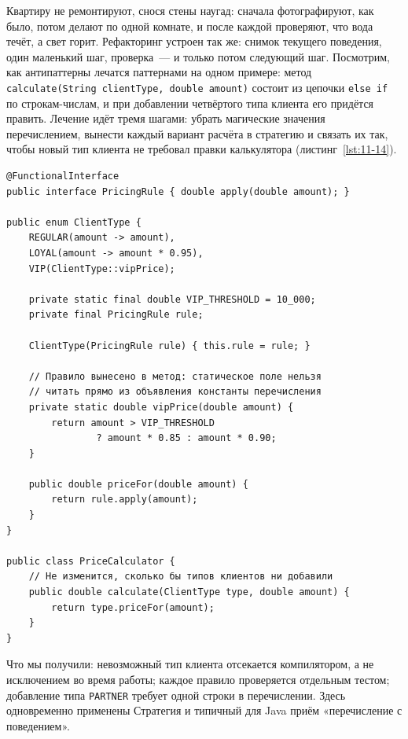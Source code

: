 Квартиру не ремонтируют, снося стены наугад: сначала фотографируют, как было,
потом делают по одной комнате, и после каждой проверяют, что вода течёт, а свет
горит. Рефакторинг устроен так же: снимок текущего поведения, один маленький
шаг, проверка~--- и только потом следующий шаг. Посмотрим, как антипаттерны
лечатся паттернами на одном примере: метод
\texttt{calculate(String clientType, double amount)} состоит из цепочки
\texttt{else if} по строкам-числам, и при добавлении четвёртого типа клиента его
придётся править. Лечение идёт тремя шагами: убрать магические значения
перечислением, вынести каждый вариант расчёта в стратегию и связать их так,
чтобы новый тип клиента не требовал правки калькулятора
(листинг~\ref{lst:11-14}).

\begin{listing}[H]
\begin{verbatim}
@FunctionalInterface
public interface PricingRule { double apply(double amount); }

public enum ClientType {
    REGULAR(amount -> amount),
    LOYAL(amount -> amount * 0.95),
    VIP(ClientType::vipPrice);

    private static final double VIP_THRESHOLD = 10_000;
    private final PricingRule rule;

    ClientType(PricingRule rule) { this.rule = rule; }

    // Правило вынесено в метод: статическое поле нельзя
    // читать прямо из объявления константы перечисления
    private static double vipPrice(double amount) {
        return amount > VIP_THRESHOLD
                ? amount * 0.85 : amount * 0.90;
    }

    public double priceFor(double amount) {
        return rule.apply(amount);
    }
}

public class PriceCalculator {
    // Не изменится, сколько бы типов клиентов ни добавили
    public double calculate(ClientType type, double amount) {
        return type.priceFor(amount);
    }
}
\end{verbatim}
\caption{Перечисление с поведением вместо цепочки условий}
\label{lst:11-14}
\end{listing}

Что мы получили: невозможный тип клиента отсекается компилятором, а не
исключением во время работы; каждое правило проверяется отдельным тестом;
добавление типа \texttt{PARTNER} требует одной строки в перечислении. Здесь
одновременно применены Стратегия и типичный для Java приём «перечисление с
поведением».

